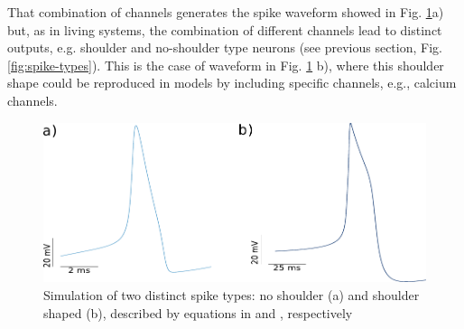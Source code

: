 \begin{table}[h!]
	\label{table:hh-equations}
\end{table}

That combination of channels generates the spike waveform showed in Fig. \ref{fig:spike-types model}a) but, as in living systems, the combination of different channels lead to distinct outputs, e.g. shoulder and no-shoulder type neurons (see previous section, Fig. \ref{fig:spike-types}). This is the case of waveform in Fig. \ref{fig:spike-types model} b), where this shoulder shape could be reproduced in models by including specific channels, e.g., calcium channels.

\begin{figure}[htb!]
	\includegraphics[width=\textwidth]{img/intro/spike-types model.pdf}
	\caption{Simulation of two distinct spike types: no shoulder (a) and shoulder shaped (b), described by equations in \cite{hodgkin_quantitative_1952} and \cite{vavoulis_balanced_2010}, respectively}
	\label{fig:spike-types model}
\end{figure}

